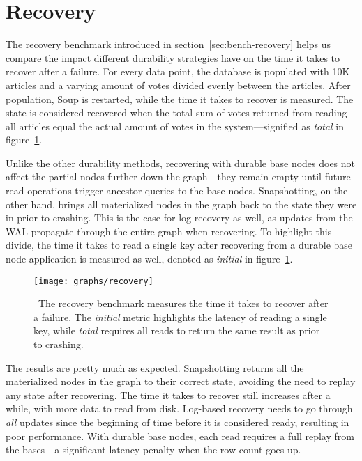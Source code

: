 \section{Recovery}

The recovery benchmark introduced in section~\ref{sec:bench-recovery} helps us
compare the impact different durability strategies have on the time it takes to
recover after a failure. For every data point, the database is populated with
10K articles and a varying amount of votes divided evenly between the articles.
After population, Soup is restarted, while the time it takes to recover is
measured. The state is considered recovered when the total sum of votes returned from
reading all articles equal the actual amount of votes in the system---signified
as \textit{total} in figure~\ref{fig:graph-recovery}.

Unlike the other durability methods, recovering with durable base nodes does not
affect the partial nodes further down the graph---they remain empty until future
read operations trigger ancestor queries to the base nodes. Snapshotting, on the
other hand, brings all materialized nodes in the graph back to the state they
were in prior to crashing. This is the case for log-recovery as well, as updates
from the WAL propagate through the entire graph when recovering. To highlight
this divide, the time it takes to read a single key after recovering from a
durable base node application is measured as well, denoted as \textit{initial}
in figure~\ref{fig:graph-recovery}.

\begin{figure}[H]
  \centering
  \texttt{[image: graphs/recovery]}
  \caption{\
    The recovery benchmark measures the time it takes to recover after
    a failure. The \textit{initial} metric highlights the latency of reading a
    single key, while \textit{total} requires all reads to return the same
    result as prior to crashing.
  }\label{fig:graph-recovery}
\end{figure}

The results are pretty much as expected. Snapshotting returns all the
materialized nodes in the graph to their correct state, avoiding the need to
replay any state after recovering. The time it takes to recover still increases
after a while, with more data to read from disk. Log-based recovery needs to go
through \textit{all} updates since the beginning of time before it is considered
ready, resulting in poor performance. With durable base nodes, each read
requires a full replay from the bases---a significant latency penalty when the
row count goes up.

